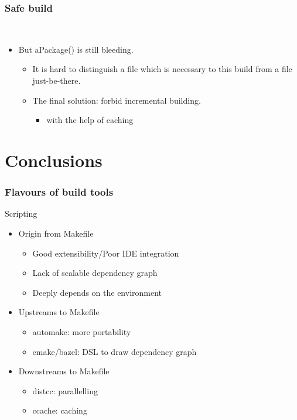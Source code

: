 \documentclass[lualatex]{beamer}
\begin{document}
\begin{frame}
  \frametitle{Safe build}

  \begin{block}{~}
    \begin{itemize}
    \item But aPackage() is still bleeding.
      \begin{itemize}
      \item It is hard to distinguish a file which is necessary to this build from a file just-be-there.
      \item The final solution: forbid incremental building.
        \begin{itemize}
        \item with the help of caching
        \end{itemize}
      \end{itemize}
    \end{itemize}
  \end{block}
\end{frame}

\section{Conclusions}

\begin{frame}
  \frametitle{Flavours of build tools}

  \begin{block}{Scripting}
    \begin{itemize}
    \item Origin from Makefile
      \begin{itemize}
      \item Good extensibility/Poor IDE integration
      \item Lack of scalable dependency graph
      \item Deeply depends on the environment
      \end{itemize}
    \item Upstreams to Makefile
      \begin{itemize}
      \item automake: more portability
      \item cmake/bazel: DSL to draw dependency graph
      \end{itemize}
    \item Downstreams to Makefile
      \begin{itemize}
      \item distcc: parallelling
      \item ccache: caching
      \end{itemize}
    \end{itemize}
  \end{block}
\end{frame}
\end{document}

